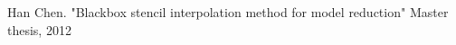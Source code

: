 \documentclass[a4paper,onecolumn]{article}
\theoremstyle{remark}
\begin{document}
\begin{thebibliography}{9}
%
Han Chen.
"Blackbox stencil interpolation method for model reduction"
Master thesis, 2012

%
%
%
%
%
%
%
%
%
%
%
%

\end{thebibliography}
\end{document}
